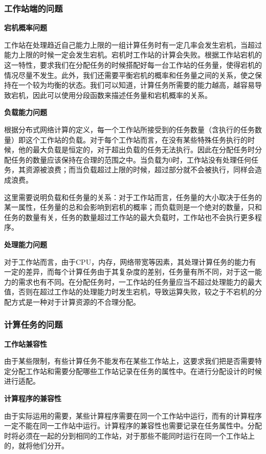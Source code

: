 \documentclass{MathorCupmodeling}
\begin{document}
\subsubsection{工作站端的问题}

\bf{宕机概率问题}

工作站在处理趋近自己能力上限的一组计算任务时有一定几率会发生宕机，当超过能力上限的时候一定会发生宕机。宕机时工作站的计算会失败。根据工作站宕机的这一特性，要求我们在分配任务的时候搭配好每一台工作站的任务量，使得宕机的情况尽量不发生。此外，我们还需要平衡宕机的概率和任务量之间的关系，使之保持在一个较为均衡的状态。我们可以知道，计算任务所需要的能力越高，越容易导致宕机，因此可以使用分段函数来描述任务量和宕机概率的关系。

\bf{负载能力问题}

根据分布式网络计算的定义，每一个工作站所接受到的任务数量（含执行的任务数量）即这个工作站的负载。对于每个工作站而言，在没有某些特殊任务执行的时候，他的最大负载是恒定的，对于超出负载的任务无法执行。因此在分配任务时分配任务的数量应该保持在合理的范围之中。当负载为0时，工作站没有处理任何任务，其资源被浪费；而当负载超过上限的时候，超过部分就不会被执行，同样会造成浪费。

这里需要说明负载和任务量的关系：对于工作站而言，任务量的大小取决于任务的某一属性，任务量的总和会影响到宕机的概率；而负载则是一个绝对的数量，只和任务的数量有关，任务的数量超过工作站的最大负载时，工作站也不会执行更多程序。

\bf{处理能力问题}

对于工作站而言，由于CPU，内存，网络带宽等因素，其处理计算任务的能力有一定的差异，而每个计算任务由于其复杂度的差别，任务量有所不同，对于这一能力的需求也有不同。在分配任务时，一工作站的任务量应当不超过处理能力的最大值，否则在超过工作站的处理能力时发生宕机，导致运算失败，较之于不宕机的分配方式是一种对于计算资源的不合理分配。

\subsubsection{计算任务的问题}

\bf{工作站兼容性}

由于某些限制，有些计算任务不能发布在某些工作站上，这要求我们把是否需要特定分配工作站和需要分配哪些工作站记录在任务的属性中。在进行分配设计的时候进行适配。

\bf{计算程序的兼容性}

由于实际运用的需要，某些计算程序需要在同一个工作站中运行，而有的计算程序一定不能在同一工作站中运行。计算程序的兼容性也需要记录在任务属性中。分配时将必须在一起的分到相同的工作站，对于那些不能同时运行在同一个工作站上的，就将他们分开。
\end{document}

